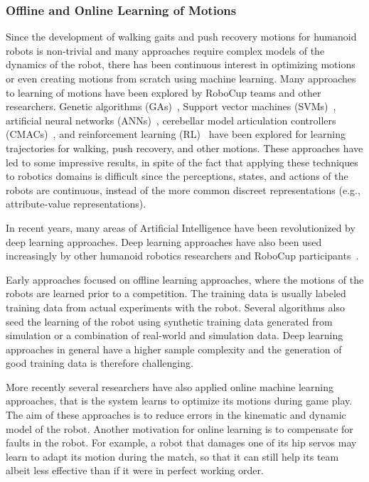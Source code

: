 \documentclass{article}
\begin{document}
\subsubsection{Offline and Online Learning of Motions}

Since the development of walking gaits and push recovery motions for humanoid robots is non-trivial and many approaches require complex models of the dynamics of the robot, there has been continuous interest in optimizing motions or even creating motions from scratch using machine learning.
Many approaches to learning of motions have been explored by RoboCup teams and other researchers.
Genetic algorithms (GAs)~\cite{Huan2018}, Support vector machines (SVMs)~\cite{Wang2013}, artificial neural networks (ANNs)~\cite{Kim2012}, cerebellar model articulation controllers (CMACs)~\cite{Sabourin2005}, and reinforcement learning (RL)~\cite{Morimoto2004} have been explored for learning trajectories for walking, push recovery, and other motions.
These approaches have led to some impressive results, in spite of the fact that applying these techniques to robotics domains is difficult since the perceptions, states, and actions of the robots are continuous, instead of the more common discreet representations (e.g., attribute-value representations).

In recent years, many areas of Artificial Intelligence have been revolutionized by deep learning approaches.
Deep learning approaches have also been used increasingly by other humanoid robotics researchers and RoboCup participants~\cite{Hwangbo2019}.

Early approaches focused on offline learning approaches, where the motions of the robots are learned prior to a competition.
The training data is usually labeled training data from actual experiments with the robot.
Several algorithms also seed the learning of the robot using synthetic training data generated from simulation or a combination of real-world and simulation data.
Deep learning approaches in general have a higher sample complexity and the generation of good training data is therefore challenging.

More recently several researchers have also applied online machine learning approaches, that is the system learns to optimize its motions during game play.
The aim of these approaches is to reduce errors in the kinematic and dynamic model of the robot.
Another motivation for online learning is to compensate for faults in the robot. For example, a robot that damages one of its hip servos may learn to adapt its motion during the match, so that it can still help its team albeit less effective than if it were in perfect working order.
\end{document}
